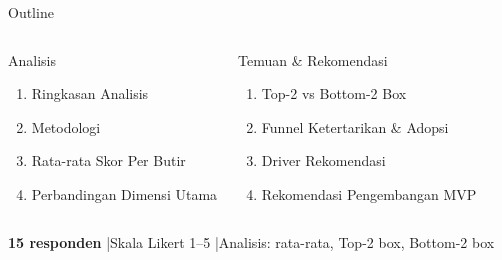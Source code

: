 \documentclass[aspectratio=169]{beamer}
\newcommand{\faDatabase}{[DB]}
\begin{document}
\begin{frame}{Outline}
  \begin{columns}[t]
      \begin{block}{Analisis}
        \begin{enumerate}\small
          \item Ringkasan Analisis
          \item Metodologi
          \item Rata-rata Skor Per Butir
          \item Perbandingan Dimensi Utama
        \end{enumerate}
      \end{block}
      \begin{block}{Temuan \& Rekomendasi}
        \begin{enumerate}\small\setcounter{enumi}{4}
          \item Top-2 vs Bottom-2 Box
          \item Funnel Ketertarikan \& Adopsi
          \item Driver Rekomendasi
          \item Rekomendasi Pengembangan MVP
        \end{enumerate}
      \end{block}
  \end{columns}
  \vspace{0.4cm}
  \begin{tcolorbox}[statbox, title={\faDatabase\quad Dataset}]
    \centering
    \textbf{15 responden} \quad|\quad Skala Likert 1--5 \quad|\quad Analisis: rata-rata, Top-2 box, Bottom-2 box
  \end{tcolorbox}
\end{frame}
\end{document}
